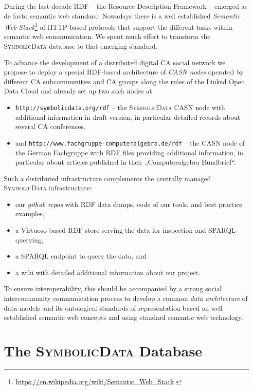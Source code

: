 \documentclass{mathincs}
\newcommand{\SD}{\textsc{Symbo\-lic\-Data}}
\begin{document}
During the last decade RDF -- the Resource Description Framework -- emerged as
de facto semantic web standard.  Nowadays there is a well established
\emph{Semantic Web
  Stack}\footnote{\url{https://en.wikipedia.org/wiki/Semantic_Web_Stack}.} of
HTTP based protocols that support the different tasks within semantic web
communication. We spent much effort to transform the {\SD} database to that
emerging standard.

To advance the development of a distributed digital CA social network we
propose to deploy a special RDF-based architecture of \emph{CASN nodes}
operated by different CA subcommunities and CA groups along the rules of the
Linked Open Data Cloud \cite{lod} and already set up two such nodes at
\begin{itemize}
\item \texttt{http://symbolicdata.org/rdf} -- the {\SD} CASN node with
  additional information in draft version, in particular detailed records about
  several CA conferences, 
\item and \texttt{http://www.fachgruppe-computeralgebra.de/rdf} -- the CASN
  node of the German Fachgruppe with RDF files providing additional information,
  in particular about articles published in their „Computeralgebra Rundbrief“.  
\end{itemize}
Such a distributed infrastructure complements the centrally managed {\SD }
infrastructure:
\begin{itemize}
\item our \emph{github repos} \cite{sdrepo} with RDF data dumps, code of our
  tools, and best practice examples,
\item a Virtuoso based RDF store \cite{sdstore} serving the data for inspection
  and SPARQL querying, 
\item a SPARQL endpoint \cite{sdsparql} to query the data, and
\item a wiki \cite{sdwiki} with detailed additional information about our
  project. 
\end{itemize}
To ensure interoperability, this should be accompanied by a strong social
intercommunity communication process to develop a common \emph{data
  architecture} of data models and its ontological standards of representation
based on well established semantic web concepts and using standard semantic web
technology.

\section{The {\SD} Database}
\end{document}
